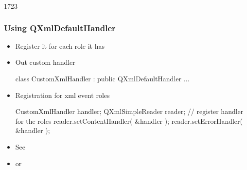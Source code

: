 \begin{slide}[fragile]{1723}\frametitle{Using QXmlDefaultHandler}
  \begin{itemize}
  \item Register it for each role it has
  \item Out custom handler
    \begin{cpp}
class CustomXmlHandler : public QXmlDefaultHandler { ... }
    \end{cpp}
  \item Registration for xml event roles
    \begin{cpp}
CustomXmlHandler handler;
QXmlSimpleReader reader;
// register handler for the roles
reader.setContentHandler( &handler );
reader.setErrorHandler( &handler );
    \end{cpp}
  \item See 
  \item or 
  \end{itemize}
\end{slide}


